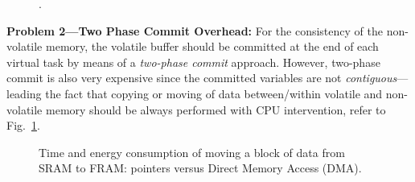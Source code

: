 \begin{figure}[t]
	\centering
	\caption{.}
	\label{fig:sram_vs_dma}
\end{figure}

\textbf{Problem 2---Two Phase Commit Overhead:} For the consistency of the non-volatile memory, the volatile buffer should be committed at the end of each virtual task by means of a \emph{two-phase commit} approach. However, two-phase commit is also very expensive since the committed variables are not \emph{contiguous}---leading the fact that copying or moving of data between/within volatile and non-volatile memory should be always performed with CPU intervention, refer to Fig.~\ref{fig:sram_vs_dma}. 

\begin{figure}[t]
	\centering
	\caption{Time and energy consumption of moving a block of data from SRAM to FRAM: pointers versus Direct Memory Access (DMA).}
	\label{fig:dmaTimeEnergy}
\end{figure}

